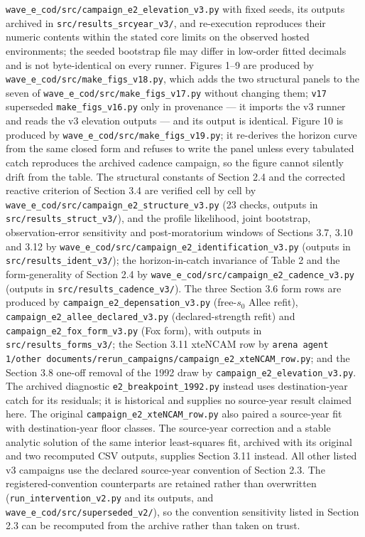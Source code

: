 \texttt{wave\_e\_cod/src/campaign\_e2\_elevation\_v3.py} with fixed
seeds, its outputs archived in \texttt{src/results\_srcyear\_v3/}, and
re-execution reproduces their numeric contents within the stated core limits on the observed hosted environments; the seeded bootstrap file may differ in low-order fitted decimals and is not byte-identical on every runner. Figures 1--9 are produced by
\texttt{wave\_e\_cod/src/make\_figs\_v18.py}, which adds the two
structural panels to the seven of
\texttt{wave\_e\_cod/src/make\_figs\_v17.py} without changing them;
\texttt{v17} superseded \texttt{make\_figs\_v16.py} only in
provenance --- it imports the v3 runner and reads the v3 elevation
outputs --- and its output is
identical. Figure 10 is produced by
\texttt{wave\_e\_cod/src/make\_figs\_v19.py}; it re-derives the
horizon curve from the same closed form and refuses to write the panel
unless every tabulated catch reproduces the archived cadence campaign,
so the figure cannot silently drift from the table. The structural
constants of Section 2.4 and the corrected reactive
criterion of Section 3.4 are verified cell by cell by
\texttt{wave\_e\_cod/src/\allowbreak{}campaign\_e2\_structure\_v3.py} (23 checks,
outputs in \texttt{src/results\_struct\_v3/}), and the profile
likelihood, joint bootstrap, observation-error sensitivity and
post-moratorium windows of Sections 3.7, 3.10 and 3.12 by
\texttt{wave\_e\_cod/src/\allowbreak{}campaign\_e2\_identification\_v3.py}
(outputs in \texttt{src/results\_ident\_v3/}); the horizon-in-catch invariance of Table 2 and the form-generality of Section 2.4 by
\texttt{wave\_e\_cod/src/\allowbreak{}campaign\_e2\_cadence\_v3.py} (outputs in \texttt{src/results\_cadence\_v3/}). The three Section 3.6
form rows are produced by
\texttt{campaign\_e2\_depensation\_v3.py} (free-\(s_0\) Allee refit),
\texttt{campaign\_e2\_allee\_declared\_v3.py} (declared-strength refit)
and \texttt{campaign\_e2\_fox\_form\_v3.py} (Fox form), with outputs in
\texttt{src/results\_forms\_v3/}; the Section 3.11 xteNCAM row by
\texttt{arena agent 1/other documents/rerun\_campaigns/\allowbreak{}campaign\_e2\_xteNCAM\_row.py};
and the Section 3.8 one-off removal of the 1992 draw by
\texttt{campaign\_e2\_elevation\_v3.py}. The archived diagnostic
\texttt{e2\_breakpoint\_1992.py} instead uses destination-year catch
for its residuals; it is historical and supplies no source-year result
claimed here. The original \texttt{campaign\_e2\_xteNCAM\_row.py}
also paired a source-year fit with destination-year floor classes. The
source-year correction and a stable analytic solution of the same
interior least-squares fit, archived with its original and two
recomputed CSV outputs, supplies Section 3.11 instead. All other listed
v3 campaigns use the declared source-year convention of Section 2.3. The
registered-convention counterparts are retained rather than overwritten
(\texttt{run\_intervention\_v2.py} and its outputs, and
\texttt{wave\_e\_cod/src/superseded\_v2/}), so the convention sensitivity
listed in Section 2.3 can be recomputed from the archive rather than
taken on trust.

